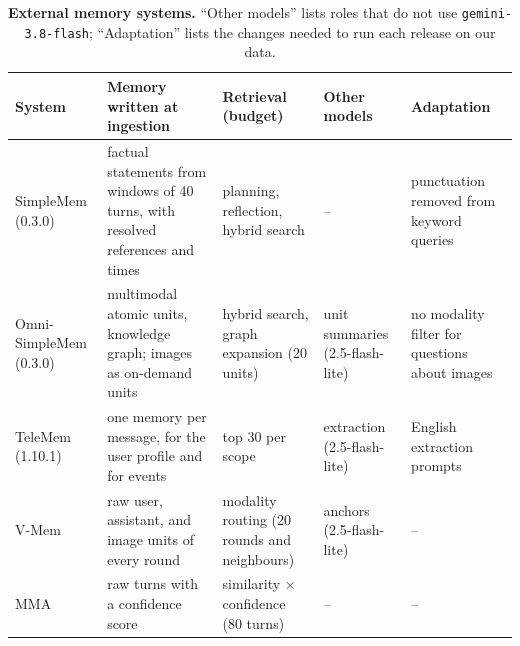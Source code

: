 \begin{table}[t]
\centering
\small
\setlength{\tabcolsep}{3.4pt}
\begin{tabularx}{\linewidth}{>{\raggedright\arraybackslash}p{2.6cm}|>{\raggedright\arraybackslash}p{3.8cm}|>{\raggedright\arraybackslash}p{3.0cm}|>{\raggedright\arraybackslash}p{2.5cm}|>{\raggedright\arraybackslash}X}
\toprule
\rowcolor{hHead} \textbf{System} & \textbf{Memory written at ingestion} & \textbf{Retrieval (budget)} & \textbf{Other models} & \textbf{Adaptation} \\
\midrule
SimpleMem (0.3.0) & factual statements from windows of 40 turns, with resolved references and times & planning, reflection, hybrid search & -- & punctuation removed from keyword queries \\
Omni-SimpleMem (0.3.0) & multimodal atomic units, knowledge graph; images as on-demand units & hybrid search, graph expansion (20 units) & unit summaries (2.5-flash-lite) & no modality filter for questions about images \\
TeleMem (1.10.1) & one memory per message, for the user profile and for events & top 30 per scope & extraction (2.5-flash-lite) & English extraction prompts \\
V-Mem & raw user, assistant, and image units of every round & modality routing (20 rounds and neighbours) & anchors (2.5-flash-lite) & -- \\
MMA & raw turns with a confidence score & similarity $\times$ confidence (80 turns) & -- & -- \\
\bottomrule
\end{tabularx}
\caption{\textbf{External memory systems.} ``Other models'' lists roles that do not use \texttt{gemini-3.8-flash}; ``Adaptation'' lists the changes needed to run each release on our data.}
\label{tab:systems}
\end{table}
